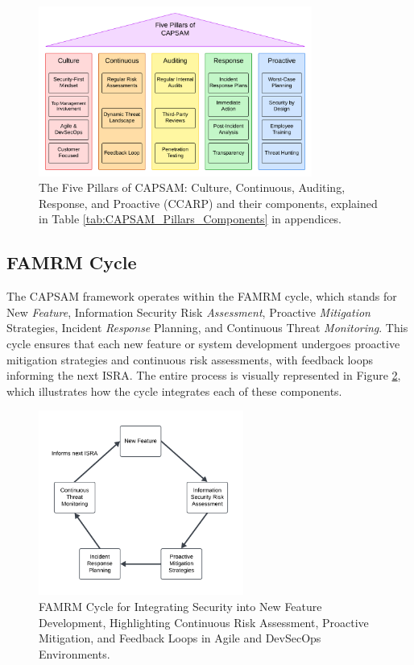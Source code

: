     \begin{figure}[htbp]
        \centering
        \includegraphics[width=0.8\textwidth]{figures/CAPSAM-Pillars.png}
        \caption{The Five Pillars of CAPSAM: Culture, Continuous, Auditing, Response, and Proactive (CCARP) and their components, explained in Table \ref{tab:CAPSAM_Pillars_Components} in appendices.}
        \label{fig:CAPSAM_Pillars}
    \end{figure}

    \subsection{FAMRM Cycle}
    The CAPSAM framework operates within the FAMRM cycle, which stands for New \textit{Feature}, Information Security Risk \textit{Assessment}, Proactive \textit{Mitigation} Strategies, Incident \textit{Response} Planning, and Continuous Threat \textit{Monitoring}. This cycle ensures that each new feature or system development undergoes proactive mitigation strategies and continuous risk assessments, with feedback loops informing the next ISRA. The entire process is visually represented in Figure \ref{fig:FAMRM_Cycle}, which illustrates how the cycle integrates each of these components.

    \begin{figure}[htbp]
        \centering
        \includegraphics[width=0.6\textwidth]{figures/FAMRM-Cycle.png}
        \caption{FAMRM Cycle for Integrating Security into New Feature Development, Highlighting Continuous Risk Assessment, Proactive Mitigation, and Feedback Loops in Agile and DevSecOps Environments.}
        \label{fig:FAMRM_Cycle}
    \end{figure}

